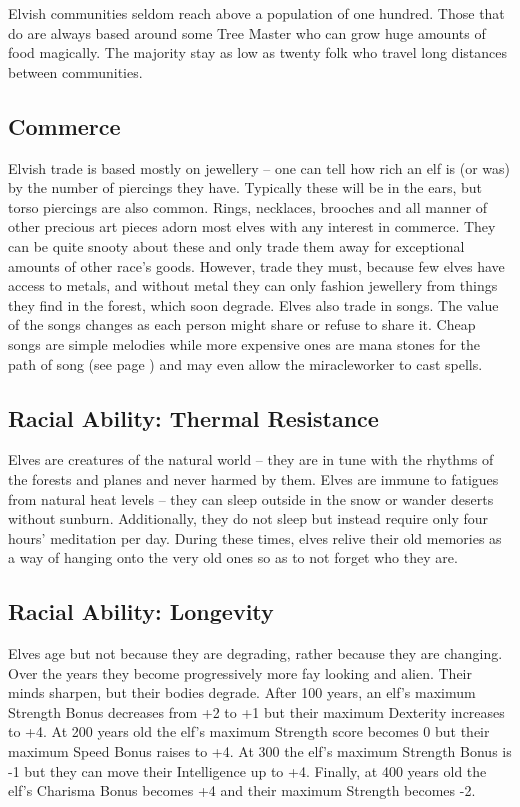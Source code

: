 \begin{multicols}{2}
Elvish communities seldom reach above a population of one hundred.
Those that do are always based around some Tree Master who can grow huge amounts of food magically.
The majority stay as low as twenty folk who travel long distances between communities.

\subsection{Commerce}

Elvish trade is based mostly on jewellery -- one can tell how rich an elf is (or was) by the number of piercings they have.
Typically these will be in the ears, but torso piercings are also common.
Rings, necklaces, brooches and all manner of other precious art pieces adorn most elves with any interest in commerce.
They can be quite snooty about these and only trade them away for exceptional amounts of other race's goods.
However, trade they must, because few elves have access to metals, and without metal they can only fashion jewellery from things they find in the forest, which soon degrade.
Elves also trade in songs.
The value of the songs changes as each person might share or refuse to share it.
Cheap songs are simple melodies while more expensive ones are mana stones for the path of song (see page \pageref{song}) and may even allow the \gls{miracleworker} to cast spells.

\subsection{Racial Ability: Thermal Resistance}

Elves are creatures of the natural world -- they are in tune with the rhythms of the forests and planes and never harmed by them.
Elves are immune to \glspl{fatigue} from natural heat levels -- they can sleep outside in the snow or wander deserts without sunburn.
Additionally, they do not sleep but instead require only four hours' meditation per day.
During these times, elves relive their old memories as a way of hanging onto the very old ones so as to not forget who they are.

\subsection{Racial Ability: Longevity}

Elves age but not because they are degrading, rather because they are changing.
Over the years they become progressively more fay looking and alien.
Their minds sharpen, but their bodies degrade.
After 100 years, an elf's maximum Strength Bonus decreases from +2 to +1 but their maximum Dexterity increases to +4.
At 200 years old the elf's maximum Strength score becomes 0 but their maximum Speed Bonus raises to +4.
At 300 the elf's maximum Strength Bonus is -1 but they can move their Intelligence up to +4.
Finally, at 400 years old the elf's Charisma Bonus becomes +4 and their maximum Strength becomes -2.


\end{multicols}
